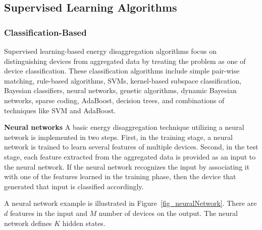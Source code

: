 \subsection{Supervised Learning Algorithms}
\subsubsection{Classification-Based}
\label{sec:supervised}
Supervised learning-based energy disaggregation algorithms focus on distinguishing devices from aggregated data 
by treating the problem as one of device classification.
These classification algorithms include
simple pair-wise matching, rule-based algorithms,
SVMs, kernel-based subspace classification,
Bayesian classifiers, neural networks,
genetic algorithms,
dynamic Bayesian networks,
sparse coding,
AdaBoost,
decision trees, and
combinations of techniques like SVM and AdaBoost.

\textbf{Neural networks}
A basic energy disaggregation technique utilizing a neural network 
is implemented in two steps. 
First, in the training stage, a neural network is trained 
to learn several features of multiple devices. 
Second, in the test stage, each feature extracted from the aggregated data 
is provided as an input to the neural network. 
If the neural network recognizes the input by associating it with one of the features learned in the training phase, then the device that generated that input is classified accordingly. 

A neural network example is 
illustrated in Figure~\ref{fig_neuralNetwork}. %
There are $d$ features in the input and 
$M$ number of devices on the output. 
The neural network defines $K$ hidden states. 


